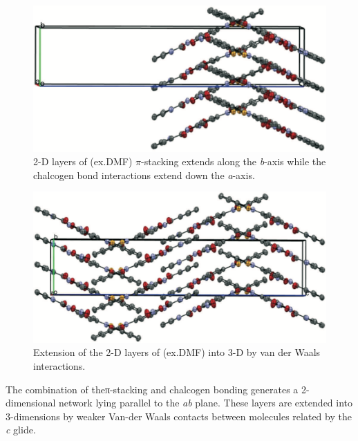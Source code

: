 \begin{figure}
    \centering
    \includegraphics[width=0.8\linewidth]{Figures/ebs-nitroamide-2py-pi-stacking.png}
    \caption{2-D layers of (ex.DMF) $\pi$-stacking extends along the \emph{b}-axis while the  chalcogen bond interactions extend down the \emph{a}-axis.}
    \label{fig:ebs-nitroamide-2py-pi-stacking}
\end{figure}

\begin{figure}
    \centering
    \includegraphics[width=0.8\linewidth]{Figures/ebs-nitroamide-2py-3d.png}
    \caption{Extension of the 2-D layers of (ex.DMF) into 3-D by van der Waals interactions.}
    \label{fig:ebs-nitroamide-2py-3d}
\end{figure}

The combination of theπ-stacking and chalcogen bonding generates a 2-dimensional network lying parallel to the \emph{ab} plane.
These layers are extended into 3-dimensions by weaker Van-der Waals contacts between molecules related by the \emph{c} glide.

